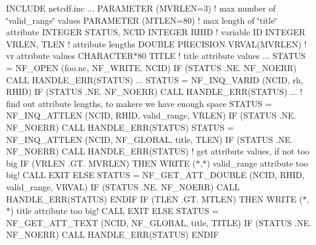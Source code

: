 I\+N\+C\+L\+U\+DE \textquotesingle{}netcdf.\+inc\textquotesingle{} ... P\+A\+R\+A\+M\+E\+T\+ER (M\+V\+R\+L\+EN=3) ! max number of \char`\"{}valid\+\_\+range\char`\"{} values P\+A\+R\+A\+M\+E\+T\+ER (M\+T\+L\+EN=80) ! max length of \char`\"{}title\char`\"{} attribute I\+N\+T\+E\+G\+ER S\+T\+A\+T\+US, N\+C\+ID I\+N\+T\+E\+G\+ER R\+H\+ID ! variable ID I\+N\+T\+E\+G\+ER V\+R\+L\+EN, T\+L\+EN ! attribute lengths D\+O\+U\+B\+LE P\+R\+E\+C\+I\+S\+I\+ON V\+R\+V\+A\+L(\+M\+V\+R\+L\+E\+N) ! vr attribute values C\+H\+A\+R\+A\+C\+T\+E\+R$\ast$80 T\+I\+T\+LE ! title attribute values ... S\+T\+A\+T\+US = N\+F\+\_\+\+O\+P\+EN (\textquotesingle{}foo.\+nc\textquotesingle{}, N\+F\+\_\+\+W\+R\+I\+TE, N\+C\+ID) IF (S\+T\+A\+T\+US .NE. N\+F\+\_\+\+N\+O\+E\+RR) C\+A\+LL H\+A\+N\+D\+L\+E\+\_\+\+E\+R\+R(\+S\+T\+A\+T\+U\+S) ... S\+T\+A\+T\+US = N\+F\+\_\+\+I\+N\+Q\+\_\+\+V\+A\+R\+ID (N\+C\+ID, \textquotesingle{}rh\textquotesingle{}, R\+H\+ID) IF (S\+T\+A\+T\+US .NE. N\+F\+\_\+\+N\+O\+E\+RR) C\+A\+LL H\+A\+N\+D\+L\+E\+\_\+\+E\+R\+R(\+S\+T\+A\+T\+U\+S) ... ! find out attribute lengths, to makere we have enough space S\+T\+A\+T\+US = N\+F\+\_\+\+I\+N\+Q\+\_\+\+A\+T\+T\+L\+EN (N\+C\+ID, R\+H\+ID, \textquotesingle{}valid\+\_\+range\textquotesingle{}, V\+R\+L\+EN) IF (S\+T\+A\+T\+US .NE. N\+F\+\_\+\+N\+O\+E\+RR) C\+A\+LL H\+A\+N\+D\+L\+E\+\_\+\+E\+R\+R(\+S\+T\+A\+T\+U\+S) S\+T\+A\+T\+US = N\+F\+\_\+\+I\+N\+Q\+\_\+\+A\+T\+T\+L\+EN (N\+C\+ID, N\+F\+\_\+\+G\+L\+O\+B\+AL, \textquotesingle{}title\textquotesingle{}, T\+L\+EN) IF (S\+T\+A\+T\+US .NE. N\+F\+\_\+\+N\+O\+E\+RR) C\+A\+LL H\+A\+N\+D\+L\+E\+\_\+\+E\+R\+R(\+S\+T\+A\+T\+U\+S) ! get attribute values, if not too big IF (V\+R\+L\+EN .GT. M\+V\+R\+L\+EN) T\+H\+EN W\+R\+I\+TE ($\ast$,$\ast$) \textquotesingle{}valid\+\_\+range attribute too big!\textquotesingle{} C\+A\+LL E\+X\+IT E\+L\+SE S\+T\+A\+T\+US = N\+F\+\_\+\+G\+E\+T\+\_\+\+A\+T\+T\+\_\+\+D\+O\+U\+B\+LE (N\+C\+ID, R\+H\+ID, \textquotesingle{}valid\+\_\+range\textquotesingle{}, V\+R\+V\+AL) IF (S\+T\+A\+T\+US .NE. N\+F\+\_\+\+N\+O\+E\+RR) C\+A\+LL H\+A\+N\+D\+L\+E\+\_\+\+E\+R\+R(\+S\+T\+A\+T\+U\+S) E\+N\+D\+IF IF (T\+L\+EN .GT. M\+T\+L\+EN) T\+H\+EN W\+R\+I\+TE ($\ast$,$\ast$) \textquotesingle{}title attribute too big!\textquotesingle{} C\+A\+LL E\+X\+IT E\+L\+SE S\+T\+A\+T\+US = N\+F\+\_\+\+G\+E\+T\+\_\+\+A\+T\+T\+\_\+\+T\+E\+XT (N\+C\+ID, N\+F\+\_\+\+G\+L\+O\+B\+AL, \textquotesingle{}title\textquotesingle{}, T\+I\+T\+LE) IF (S\+T\+A\+T\+US .NE. N\+F\+\_\+\+N\+O\+E\+RR) C\+A\+LL H\+A\+N\+D\+L\+E\+\_\+\+E\+R\+R(\+S\+T\+A\+T\+U\+S) E\+N\+D\+IF


